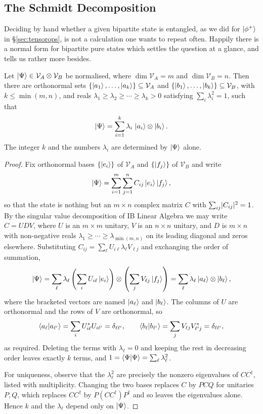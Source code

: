 \documentclass[a4paper]{scrartcl}
\newcommand{\Vs}{\mathcal{V}}
\begin{document}
\subsection{The Schmidt Decomposition}\label{sec:schmidt}

Deciding by hand whether a given bipartite state is entangled, as we did for $\ket{\phi^+}$ in \S\ref{sec:tensorops}, is not a calculation one wants to repeat often. Happily there is a normal form for bipartite pure states which settles the question at a glance, and tells us rather more besides.

\begin{theorem}
	Let $\ket{\Psi}\in\Vs_A\otimes\Vs_B$ be normalised, where $\dim\Vs_A = m$ and $\dim\Vs_B = n$. Then there are orthonormal sets $\{\ket{a_1},\dots,\ket{a_k}\}\subseteq\Vs_A$ and $\{\ket{b_1},\dots,\ket{b_k}\}\subseteq\Vs_B$, with $k\leq\min(m,n)$, and reals $\lambda_1\geq\lambda_2\geq\cdots\geq\lambda_k>0$ satisfying $\sum_i\lambda_i^2 = 1$, such that
	$$\ket\Psi = \sum_{i=1}^k\lambda_i\,\ket{a_i}\otimes\ket{b_i}.$$
	The integer $k$ and the numbers $\lambda_i$ are determined by $\ket\Psi$ alone.
\end{theorem}

\begin{proof}
	Fix orthonormal bases $\{\ket{e_i}\}$ of $\Vs_A$ and $\{\ket{f_j}\}$ of $\Vs_B$ and write
	$$\ket\Psi = \sum_{i=1}^m\sum_{j=1}^nC_{ij}\ket{e_i}\ket{f_j},$$
	so that the state is nothing but an $m\times n$ complex matrix $C$ with $\sum_{ij}\lvert C_{ij}\rvert^2 = 1$. By the singular value decomposition of IB Linear Algebra we may write $C = UDV$, where $U$ is an $m\times m$ unitary, $V$ is an $n\times n$ unitary, and $D$ is $m\times n$ with non-negative reals $\lambda_1\geq\cdots\geq\lambda_{\min(m,n)}$ on its leading diagonal and zeros elsewhere. Substituting $C_{ij} = \sum_\ell U_{i\ell}\lambda_\ell V_{\ell j}$ and exchanging the order of summation,
	$$\ket\Psi = \sum_\ell\lambda_\ell\left(\sum_iU_{i\ell}\ket{e_i}\right)\otimes\left(\sum_jV_{\ell j}\ket{f_j}\right) = \sum_\ell \lambda_\ell\ket{a_\ell}\otimes\ket{b_\ell},$$
	where the bracketed vectors are named $\ket{a_\ell}$ and $\ket{b_\ell}$. The columns of $U$ are orthonormal and the rows of $V$ are orthonormal, so
	$$\ip{a_\ell}{a_{\ell'}} = \sum_i U_{i\ell}^*U_{i\ell'} = \delta_{\ell\ell'}, \qquad \ip{b_\ell}{b_{\ell'}} = \sum_jV_{\ell j}V_{\ell' j}^* = \delta_{\ell\ell'},$$
	as required. Deleting the terms with $\lambda_\ell = 0$ and keeping the rest in decreasing order leaves exactly $k$ terms, and $1 = \ip{\Psi}{\Psi} = \sum_\ell\lambda_\ell^2$.

	For uniqueness, observe that the $\lambda_\ell^2$ are precisely the nonzero eigenvalues of $CC^\dagger$, listed with multiplicity. Changing the two bases replaces $C$ by $PCQ$ for unitaries $P,Q$, which replaces $CC^\dagger$ by $P(CC^\dagger)P^\dagger$ and so leaves the eigenvalues alone. Hence $k$ and the $\lambda_\ell$ depend only on $\ket\Psi$.
\end{proof}
\end{document}
